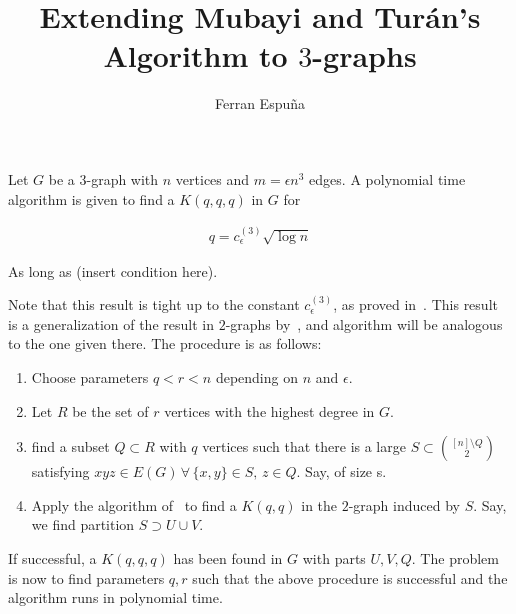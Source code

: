 \documentclass[12pt]{article}
\author{Ferran Espuña}
\date{} %
\begin{document}
    \title{Extending Mubayi and Turán's Algorithm to $3$-graphs}

    \maketitle

    Let $G$ be a $3$-graph with $n$ vertices and $m = \epsilon n^3$ edges.
    A polynomial time algorithm is given to find a $K(q, q, q)$ in $G$ for

    \begin{align*}
        q = c^{(3)}_{\epsilon} \sqrt {\log n}\label{eq:q}
    \end{align*}

    As long as (insert condition here). %
    
    Note that this result is tight up to the constant $c^{(3)}_{\epsilon}$,
    as proved in~\cite{Erods1964}.
    This result is a generalization of the result in $2$-graphs by~\cite{MUBAYI2010174},
    and algorithm will be analogous to the one given there.
    The procedure is as follows:

    \begin{enumerate}
        \item Choose parameters $q < r < n$ depending on $n$ and $\epsilon$.
        \item Let $R$ be the set of $r$ vertices with the highest degree in $G$.
        \item find a subset $Q \subset R$ with $q$ vertices such that there is a large
        $S \subset \binom{[n] \setminus Q}{2}$ satisfying
        $xyz \in E(G) \, \forall \, \{x, y\} \in S, \, z \in Q$.
        Say, of size s.
        \item Apply the algorithm of~\cite{MUBAYI2010174} to find a $K(q, q)$ in the
        $2$-graph induced by $S$.
        Say, we find partition $S \supset U \cup V$.
    \end{enumerate}

    If successful, a $K(q, q, q)$ has been found in $G$ with parts $U, V, Q$.
    The problem is now to find parameters $q, r$ such that the above procedure is successful
    and the algorithm runs in polynomial time.
\end{document}
